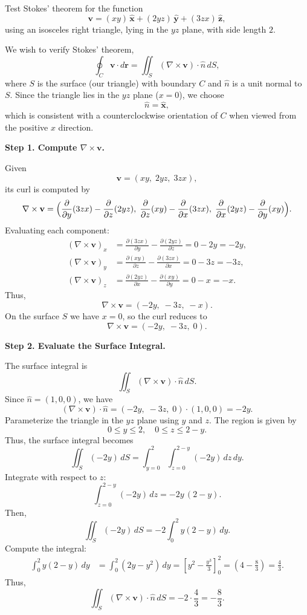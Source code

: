 \begin{hwkProblem}{1.34}{}

	Test Stokes' theorem for the function 
	\[
		\mathbf{v} = (xy)\,\hat{\mathbf{x}} + (2yz)\,\hat{\mathbf{y}} + (3zx)\,\hat{\mathbf{z}},
	\]
	using an isosceles right triangle, lying in the \(yz\) plane, with side length \(2\).

	\hwkSol

	We wish to verify Stokes' theorem,
	\[
		\oint_C \mathbf{v}\cdot d\mathbf{r} = \iint_S (\nabla\times \mathbf{v})\cdot \hat{n}\, dS,
	\]
	where \(S\) is the surface (our triangle) with boundary \(C\) and \(\hat{n}\) is a unit normal to \(S\). Since the triangle lies in the \(yz\) plane (\(x=0\)), we choose 
	\[
		\hat{n} = \hat{\mathbf{x}},
	\]
	which is consistent with a counterclockwise orientation of \(C\) when viewed from the positive \(x\) direction.

	\medskip
	\textbf{Step 1. Compute \(\nabla\times\mathbf{v}\).}

	Given
	\[
		\mathbf{v} = (xy,\; 2yz,\; 3zx),
	\]
	its curl is computed by
	\[
		\nabla\times \mathbf{v} = \Bigl( \frac{\partial}{\partial y}(3zx) - \frac{\partial}{\partial z}(2yz),\; \frac{\partial}{\partial z}(xy) - \frac{\partial}{\partial x}(3zx),\; \frac{\partial}{\partial x}(2yz) - \frac{\partial}{\partial y}(xy) \Bigr).
	\]
	Evaluating each component:
	\[
		\begin{aligned}
			(\nabla\times \mathbf{v})_x &= \frac{\partial (3zx)}{\partial y} - \frac{\partial (2yz)}{\partial z} = 0 - 2y = -2y,\\[1mm]
			(\nabla\times \mathbf{v})_y &= \frac{\partial (xy)}{\partial z} - \frac{\partial (3zx)}{\partial x} = 0 - 3z = -3z,\\[1mm]
			(\nabla\times \mathbf{v})_z &= \frac{\partial (2yz)}{\partial x} - \frac{\partial (xy)}{\partial y} = 0 - x = -x.
		\end{aligned}
	\]
	Thus,
	\[
		\nabla\times \mathbf{v} = (-2y,\; -3z,\; -x).
	\]
	On the surface \(S\) we have \(x=0\), so the curl reduces to
	\[
		\nabla\times \mathbf{v} = (-2y,\; -3z,\; 0).
	\]

	\medskip
	\textbf{Step 2. Evaluate the Surface Integral.}

	The surface integral is
	\[
		\iint_S (\nabla\times \mathbf{v})\cdot \hat{n}\, dS.
	\]
	Since \(\hat{n} = (1,0,0)\), we have
	\[
		(\nabla\times \mathbf{v})\cdot \hat{n} = (-2y,\; -3z,\; 0)\cdot (1,0,0) = -2y.
	\]
	Parameterize the triangle in the \(yz\) plane using \(y\) and \(z\). The region is given by
	\[
		0\le y\le 2,\quad 0\le z\le 2-y.
	\]
	Thus, the surface integral becomes
	\[
		\iint_S (-2y)\, dS = \int_{y=0}^{2} \int_{z=0}^{2-y} (-2y)\,dz\,dy.
	\]
	Integrate with respect to \(z\):
	\[
		\int_{z=0}^{2-y} (-2y)\,dz = -2y\,(2-y).
	\]
	Then,
	\[
		\iint_S (-2y)\, dS = -2\int_{0}^{2} y(2-y)\,dy.
	\]
	Compute the integral:
	\[
		\begin{aligned}
			\int_{0}^{2} y(2-y)\,dy &= \int_{0}^{2} (2y-y^2)\,dy 
			=\left[ y^2 - \frac{y^3}{3}\right]_{0}^{2} 
			= \left(4 - \frac{8}{3}\right)
			=\frac{4}{3}.
		\end{aligned}
	\]
	Thus,
	\[
		\iint_S (\nabla\times \mathbf{v})\cdot \hat{n}\, dS = -2\cdot\frac{4}{3} = -\frac{8}{3}.
	\]


\end{hwkProblem}
